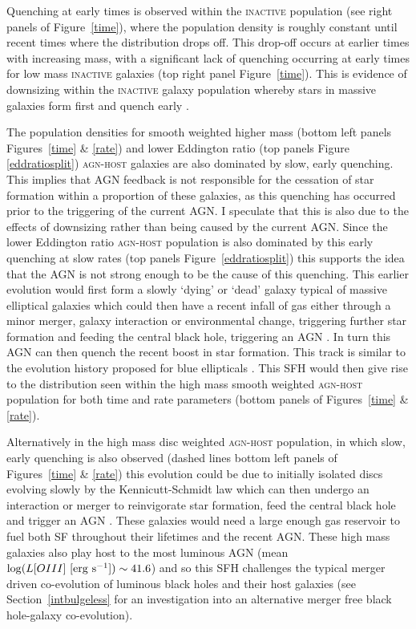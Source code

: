 Quenching at early times is observed within the \textsc{inactive} population (see right panels of Figure~\ref{time}), where the population density is roughly constant until recent times where the distribution drops off.  This drop-off occurs at earlier times with increasing mass, with a significant lack of quenching occurring at early times for low mass \textsc{inactive} galaxies (top right panel Figure~\ref{time}). This is evidence of downsizing within the \textsc{inactive} galaxy population whereby stars in massive galaxies form first and quench early \citep{Cowie96, Thomas10}. 

The population densities for smooth weighted higher mass (bottom left panels Figures~\ref{time} \& \ref{rate}) and lower Eddington ratio (top panels Figure \ref{eddratiosplit}) \textsc{agn-host} galaxies are also dominated by slow, early quenching. This implies that AGN feedback is not responsible for the cessation of star formation within a proportion of these galaxies, as this quenching has occurred prior to the triggering of the current AGN. I speculate that this is also due to the effects of downsizing rather than being caused by the current AGN. Since the lower Eddington ratio \textsc{agn-host} population is also dominated by this early quenching at slow rates (top panels Figure~\ref{eddratiosplit}) this supports the idea that the AGN is not strong enough to be the cause of this quenching.  This earlier evolution would first form a slowly `dying' or `dead' galaxy typical of massive elliptical galaxies which could then have a recent infall of gas either through a minor merger, galaxy interaction or environmental change, triggering further star formation and feeding the central black hole, triggering an AGN \citep{kaviraj14b}. In turn this AGN can then quench the recent boost in star formation. This track is similar to the evolution history proposed for blue ellipticals \citep[][and detected in the top panel of Figure~\ref{blue_c}]{Kaviraj13, McIntosh14, Haines15}. This SFH would then give rise to the distribution seen within the high mass smooth weighted \textsc{agn-host} population for both time and rate parameters (bottom panels of Figures~\ref{time} \& \ref{rate}).

Alternatively in the high mass disc weighted \textsc{agn-host} population, in which slow, early quenching is also observed (dashed lines bottom left panels of Figures~\ref{time} \& \ref{rate}) this evolution could be due to initially isolated discs evolving slowly by the Kennicutt-Schmidt \citep{schmidt59, kennicutt97} law which can then undergo an interaction or merger to reinvigorate star formation, feed the central black hole and trigger an AGN \citep{Varela04, emsellem15}. These galaxies would need a large enough gas reservoir to fuel both SF throughout their lifetimes and the recent AGN. These high mass galaxies also play host to the most luminous AGN (mean $\log (L[OIII] ~[\rm{erg}~s^{-1}]) \sim 41.6$) and so this SFH challenges the typical merger driven co-evolution of luminous black holes and their host galaxies (see Section~\ref{intbulgeless} for an investigation into an alternative merger free black hole-galaxy co-evolution). 

